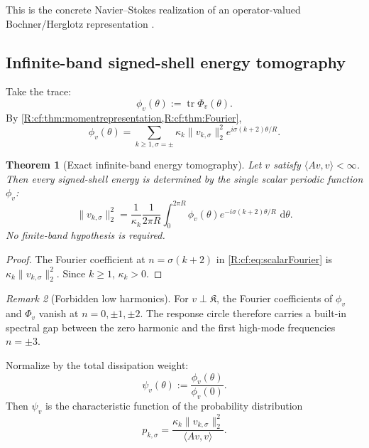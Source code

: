 \documentclass[
 aps,
 prd,
 reprint,
 amsmath,
 amssymb,
 nofootinbib,
 superscriptaddress
]{revtex4-2}
\newtheorem{theorem}{Theorem}[section]
\theoremstyle{definition}
\theoremstyle{remark}
\newtheorem{remark}[theorem]{Remark}
\newcommand{\cK}{\mathfrak K}
\newcommand{\dd}{\,\mathrm d}
\newcommand{\tr}{\operatorname{tr}}
\begin{document}
This is the concrete Navier--Stokes realization of an operator-valued
Bochner/Herglotz representation \cite{Minh2016}.

\subsection{Infinite-band signed-shell energy tomography}

Take the trace:
\begin{equation}
 \phi_v(\theta)
 :=
 \tr\Phi_v(\theta).
 \label{R:cf:eq:phi}
\end{equation}
By \cref{R:cf:thm:momentrepresentation,R:cf:thm:Fourier},
\begin{equation}
 \boxed{
 \phi_v(\theta)
 =
 \sum_{k\ge1,\sigma=\pm}
 \kappa_k
 \|v_{k,\sigma}\|_2^2
 e^{i\sigma(k+2)\theta/R}.
 }
 \label{R:cf:eq:scalarFourier}
\end{equation}

\begin{theorem}[Exact infinite-band energy tomography]
\label{R:cf:thm:infiniteTomography}
Let $v$ satisfy $\langle Av,v\rangle<\infty$.  Then every signed-shell
energy is determined by the single scalar periodic function
$\phi_v$:
\begin{equation}
 \boxed{
 \|v_{k,\sigma}\|_2^2
 =
 \frac{1}{\kappa_k}
 \frac{1}{2\pi R}
 \int_0^{2\pi R}
 \phi_v(\theta)
 e^{-i\sigma(k+2)\theta/R}
 \,\dd\theta.
 }
 \label{R:cf:eq:energyinversion}
\end{equation}
No finite-band hypothesis is required.
\end{theorem}

\begin{proof}
The Fourier coefficient at
$n=\sigma(k+2)$ in \eqref{R:cf:eq:scalarFourier} is
$\kappa_k\|v_{k,\sigma}\|_2^2$.  Since $k\ge1$, $\kappa_k>0$.
\end{proof}

\begin{remark}[Forbidden low harmonics]
For $v\perp\cK$, the Fourier coefficients of $\phi_v$ and $\Phi_v$ vanish
at $n=0,\pm1,\pm2$.  The response circle therefore carries a built-in
spectral gap between the zero harmonic and the first high-mode frequencies
$n=\pm3$.
\end{remark}

Normalize by the total dissipation weight:
\begin{equation}
 \psi_v(\theta)
 :=
 \frac{\phi_v(\theta)}{\phi_v(0)}.
 \label{R:cf:eq:psi}
\end{equation}
Then $\psi_v$ is the characteristic function of the probability distribution
\begin{equation}
 p_{k,\sigma}
 =
 \frac{
 \kappa_k\|v_{k,\sigma}\|_2^2
 }{
 \langle Av,v\rangle
 }.
 \label{R:cf:eq:pk}
\end{equation}
\end{document}
